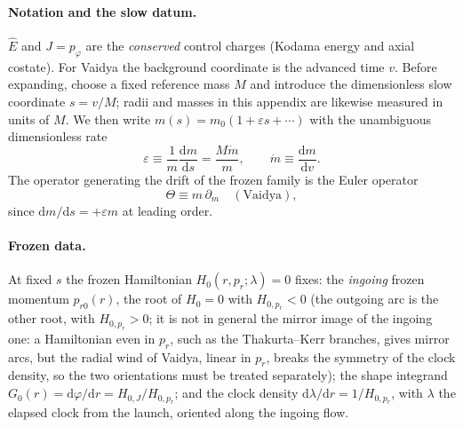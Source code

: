 \documentclass[12pt]{iopart}
\newcommand{\Ehat}{\hat E}
\newcommand{\dd}{\mathrm{d}}
\theoremstyle{plain}
\theoremstyle{definition}
\theoremstyle{plain}
\theoremstyle{remark}
\begin{document}
\paragraph{Notation and the slow datum.} $\Ehat$ and $J=p_\varphi$ are the
\emph{conserved} control charges (Kodama energy and axial costate). For Vaidya the
background coordinate is the advanced time $v$. Before expanding, choose a fixed
reference mass $M$ and introduce the dimensionless slow coordinate $s=v/M$; radii and
masses in this appendix are likewise measured in units of $M$. We then write
$m(s)=m_0(1+\varepsilon s+\cdots)$ with the unambiguous dimensionless rate
\[
    \varepsilon\equiv\frac{1}{m}\frac{\dd m}{\dd s}
    =\frac{M\dot m}{m},\qquad \dot m\equiv\frac{\dd m}{\dd v}.
\]
The operator generating the drift of the frozen family is the
Euler operator
\begin{equation}
    \Theta\equiv m\,\partial_m\quad(\text{Vaidya}),
    \label{eq:theta-op}
\end{equation}
since $\dd m/\dd s=+\varepsilon m$ at leading order.

\paragraph{Frozen data.} At fixed $s$ the frozen Hamiltonian $H_0(r,p_r;\lambda)=0$
fixes: the \emph{ingoing} frozen momentum $p_{r0}(r)$, the root of $H_0=0$ with
$H_{0,p_r}<0$ (the outgoing arc is the other root, with $H_{0,p_r}>0$; it is not in
general the mirror image of the ingoing one: a Hamiltonian even in $p_r$, such as the
Thakurta--Kerr branches, gives mirror arcs, but the radial wind of Vaidya, linear in
$p_r$, breaks the symmetry of the clock density, so the two orientations must be treated
separately); the shape
integrand $G_0(r)=\dd\varphi/\dd r=H_{0,J}/H_{0,p_r}$; and the clock density
$\dd\lambda/\dd r=1/H_{0,p_r}$, with $\lambda$ the elapsed clock from the launch, oriented
along the ingoing flow.
\end{document}
